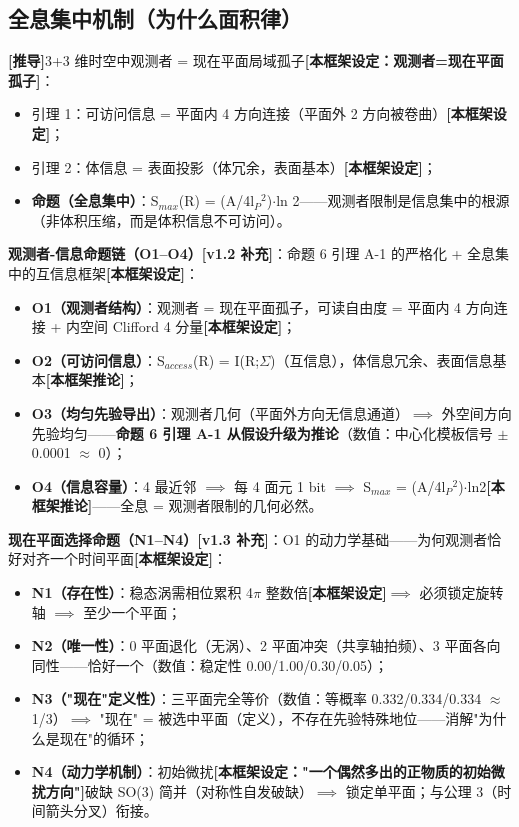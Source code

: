 \documentclass[UTF8,fontset=windows]{csoarticle}
\newcommand{\mtag}[1]{\textbf{[#1]}}
\newcommand{\up}[1]{\ensuremath{^{#1}}}
\newcommand{\down}[1]{\ensuremath{_{#1}}}
\begin{document}
\subsection{全息集中机制（为什么面积律）}

\mtag{推导}3+3 维时空中观测者 = 现在平面局域孤子\mtag{本框架设定：观测者=现在平面孤子}：
\begin{itemize}
\item 引理 1：可访问信息 = 平面内 4 方向连接（平面外 2 方向被卷曲）\mtag{本框架设定}；
\item 引理 2：体信息 = 表面投影（体冗余，表面基本）\mtag{本框架设定}；
\item \textbf{命题（全息集中）}：S\down{max}(R) = (A/4l\down{P}\up{2})\ensuremath{\cdot}ln 2------观测者限制是信息集中的根源（非体积压缩，而是体积信息不可访问）。
\end{itemize}

\textbf{观测者-信息命题链（O1--O4）\mtag{v1.2 补充}}：命题 6 引理 A-1 的严格化 + 全息集中的互信息框架\mtag{本框架设定}：
\begin{itemize}
\item \textbf{O1（观测者结构）}：观测者 = 现在平面孤子，可读自由度 = 平面内 4 方向连接 + 内空间 Clifford 4 分量\mtag{本框架设定}；
\item \textbf{O2（可访问信息）}：S\down{access}(R) = I(R;\ensuremath{\Sigma})（互信息），体信息冗余、表面信息基本\mtag{本框架推论}；
\item \textbf{O3（均匀先验导出）}：观测者几何（平面外方向无信息通道）\ensuremath{\implies} 外空间方向先验均匀------\textbf{命题 6 引理 A-1 从假设升级为推论}（数值：中心化模板信号 \ensuremath{\pm}0.0001 \ensuremath{\approx} 0）；
\item \textbf{O4（信息容量）}：4 最近邻 \ensuremath{\implies} 每 4 面元 1 bit \ensuremath{\implies} S\down{max} = (A/4l\down{P}\up{2})\ensuremath{\cdot}ln2\mtag{本框架推论}------全息 = 观测者限制的几何必然。
\end{itemize}

\textbf{现在平面选择命题（N1--N4）\mtag{v1.3 补充}}：O1 的动力学基础------为何观测者恰好对齐一个时间平面\mtag{本框架设定}：
\begin{itemize}
\item \textbf{N1（存在性）}：稳态涡需相位累积 4\ensuremath{\pi} 整数倍\mtag{本框架设定}\ensuremath{\implies} 必须锁定旋转轴 \ensuremath{\implies} 至少一个平面；
\item \textbf{N2（唯一性）}：0 平面退化（无涡）、2 平面冲突（共享轴拍频）、3 平面各向同性------恰好一个（数值：稳定性 0.00/1.00/0.30/0.05）；
\item \textbf{N3（"现在"定义性）}：三平面完全等价（数值：等概率 0.332/0.334/0.334 \ensuremath{\approx} 1/3）\ensuremath{\implies} "现在" = 被选中平面（定义），不存在先验特殊地位------消解"为什么是现在"的循环；
\item \textbf{N4（动力学机制）}：初始微扰\mtag{本框架设定："一个偶然多出的正物质的初始微扰方向"}破缺 SO(3) 简并（对称性自发破缺）\ensuremath{\implies} 锁定单平面；与公理 3（时间箭头分叉）衔接。
\end{itemize}
\end{document}
